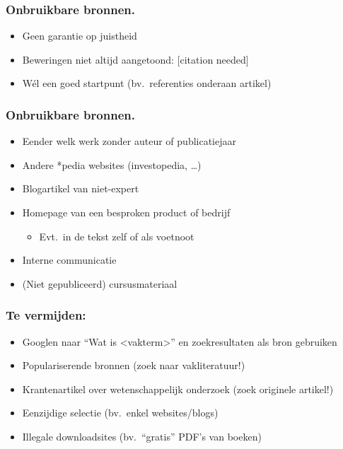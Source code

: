 \documentclass[aspectratio=169]{beamer}
\begin{document}
\begin{frame}
  \frametitle{Onbruikbare bronnen.}


  {\pause}

  \begin{itemize}
    \item Geen garantie op juistheid
    \item Beweringen niet altijd aangetoond: [citation needed]
    \item \alert{Wél} een goed startpunt (bv.\ referenties onderaan artikel)
  \end{itemize}
\end{frame}


\begin{frame}
  \frametitle{Onbruikbare bronnen.}

  \begin{itemize}
    \item Eender welk werk zonder auteur of publicatiejaar
    \item Andere *pedia websites (investopedia, \dots)
    \item Blogartikel van niet-expert
    \item Homepage van een besproken product of bedrijf
          \begin{itemize}
            \item Evt.~in de tekst zelf of als voetnoot
          \end{itemize}
    \item Interne communicatie
    \item (Niet gepubliceerd) cursusmateriaal
  \end{itemize}
\end{frame}


\begin{frame}
  \frametitle{Te vermijden:}

  \begin{itemize}
    \item Googlen naar ``Wat is <vakterm>'' en zoekresultaten als bron gebruiken
    \item Populariserende bronnen (zoek naar vakliteratuur!)
    \item Krantenartikel over wetenschappelijk onderzoek (zoek originele artikel!)
    \item Eenzijdige selectie (bv.~enkel websites/blogs)
    \item Illegale downloadsites (bv.~``gratis'' PDF's van boeken)
  \end{itemize}
\end{frame}
\end{document}
